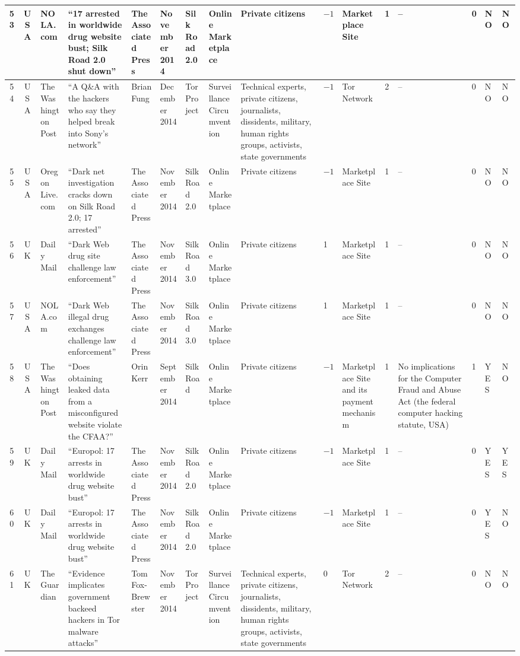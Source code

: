 \begin{landscape}
{\begin{longtable}{|c|c|p{1.2cm}|p{2.5cm}|p{1.4cm}|p{1.2cm}|p{1.4cm}|p{1.2cm}|p{1.8cm}|p{0.4cm}|p{1.8cm}|p{0.4cm}|p{1.5cm}|p{0.4cm}|p{0.6cm}|p{0.6cm}|}
\hline
53 & USA & NOLA.com & ``17 arrested in worldwide drug website bust; Silk Road 2.0 shut down'' & The Associated Press & November 2014 &Silk Road 2.0 & Online Marketplace & Private citizens & $-1$ & Marketplace Site & 1 & -- & 0 & NO & NO \\
\hline
54 & USA & The Washington Post & ``A Q\&A with the hackers who say they helped break into Sony's network'' & Brian Fung & December 2014 &Tor Project & Surveillance Circumvention & Technical experts, private citizens, journalists, dissidents, military, human rights groups, activists, state governments & $-1$ & Tor Network & 2 & -- & 0 & NO & NO \\
\hline
55 & USA & Oregon Live.com & ``Dark net investigation cracks down on Silk Road 2.0; 17 arrested'' & The Associated Press & November 2014 &Silk Road 2.0 & Online Marketplace & Private citizens & $-1$ & Marketplace Site & 1 & -- & 0 & NO & NO \\
\hline
56 & UK & Daily Mail & ``Dark Web drug site challenge law enforcement'' & The Associated Press & November 2014 &Silk Road 3.0 & Online Marketplace & Private citizens & 1 & Marketplace Site & 1 & -- & 0 & NO & NO \\
\hline
57 & USA & NOLA.com & ``Dark Web illegal drug exchanges challenge law enforcement'' & The Associated Press & November 2014 &Silk Road 3.0 & Online Marketplace & Private citizens & 1 & Marketplace Site & 1 & -- & 0 & NO & NO \\
\hline
58 & USA & The Washington Post & ``Does obtaining leaked data from a misconfigured website violate the CFAA?'' & Orin Kerr & September 2014 &Silk Road & Online Marketplace & Private citizens & $-1$ & Marketplace Site and its payment mechanism & 1 & No implications for the Computer Fraud and Abuse Act (the federal computer hacking statute, USA) & 1 & YES & NO \\
\hline
59 & UK & Daily Mail & ``Europol: 17 arrests in worldwide drug website bust'' & The Associated Press & November 2014 &Silk Road 2.0 & Online Marketplace & Private citizens & $-1$ & Marketplace Site & 1 & -- & 0 & YES & YES \\
\hline
60 & UK & Daily Mail & ``Europol: 17 arrests in worldwide drug website bust'' & The Associated Press & November 2014 &Silk Road 2.0 & Online Marketplace & Private citizens & $-1$ & Marketplace Site & 1 & -- & 0 & YES & NO \\
\hline
61 & UK & The Guardian & ``Evidence implicates government backeed hackers in Tor malware attacks'' & Tom Fox-Brewster & November 2014 &Tor Project & Surveillance Circumvention & Technical experts, private citizens, journalists, dissidents, military, human rights groups, activists, state governments & 0 & Tor Network & 2 & -- & 0 & NO & NO \\

\end{longtable}}
\end{landscape}
